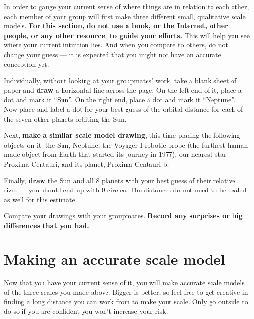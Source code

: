 In order to gauge your current sense of where things are in relation to each other, each member of your group will first make three different small, qualitative scale models. \textbf{For this section, do not use a book, or the Internet, other people, or any other resource, to guide your efforts.} This will help you see where your current intuition lies. And when you compare to others, do not change your guess --- it is expected that you might not have an accurate conception yet.

\begin{steps}
	\item Individually, without looking at your groupmates' work, take a blank sheet of paper and \textbf{draw} a horizontal line across the page. On the left end of it, place a dot and mark it ``Sun''. On the right end, place a dot and mark it ``Neptune''. Now place and label a dot for your best guess of the orbital distance for each of the seven other planets orbiting the Sun.

	\item Next, \textbf{make a similar scale model drawing}, this time placing the following objects on it: the Sun, Neptune, the Voyager I robotic probe (the furthest human-made object from Earth that started its journey in 1977), our nearest star Proxima Centauri, and its planet, Proxima Centauri b.
	
	\item Finally, \textbf{draw} the Sun and all 8 planets with your best guess of their relative sizes --- you should end up with 9 circles. The distances do not need to be scaled as well for this estimate.

	\item Compare your drawings with your groupmates. \textbf{Record any surprises or big differences that you had.}
\end{steps}

\section{Making an accurate scale model}\label{se:sec:model}

Now that you have your current sense of it, you will make accurate scale models of the three scales you made above. Bigger is better, so 
feel free to get creative in finding a long distance you can work from to make your scale. Only go outside to do so if you are confident you won't increase your risk.

